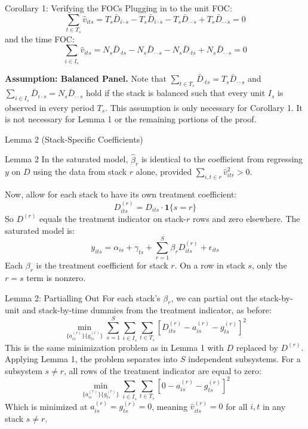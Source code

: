 \documentclass[11pt]{beamer}
\begin{document}
\begin{frame}{Corollary 1: Verifying the FOCs}
    Plugging in to the unit FOC:
    \[
        \sum_{t \in T_s} \hat{v}_{its}
        = T_s \bar{D}_{i \cdot s} - T_s \bar{D}_{i \cdot s}
          - T_s \bar{D}_{\cdot \cdot s} + T_s \bar{D}_{\cdot \cdot s} = 0
    \]
    and the time FOC:
    \[
        \sum_{i \in I_s} \hat{v}_{its}
        = N_s \bar{D}_{\cdot ts} - N_s \bar{D}_{\cdot \cdot s}
          - N_s \bar{D}_{\cdot ts} + N_s \bar{D}_{\cdot \cdot s} = 0
    \]

    \vspace{3mm}

    \textbf{Assumption: Balanced Panel.} Note that
    $\sum_{t \in T_s} \bar{D}_{\cdot ts} = T_s \bar{D}_{\cdot \cdot s}$ and
    $\sum_{i \in I_s} \bar{D}_{i \cdot s} = N_s \bar{D}_{\cdot \cdot s}$ hold if
    the stack is balanced such that every unit $I_s$ is observed in every period
    $T_s$. This assumption is only necessary for Corollary 1. It is not
    necessary for Lemma 1 or the remaining portions of the proof.
\end{frame}

\begin{frame}{Lemma 2 (Stack-Specific Coefficients)}
    \begin{block}{Lemma 2}
        In the saturated model, $\hat{\beta}_r$ is identical to the coefficient
        from regressing $y$ on $D$ using the data from stack $r$ alone, provided
        $\sum_{i,t \in r} \hat{v}_{itr}^2 > 0$.
    \end{block}

    Now, allow for each stack to have its own treatment coefficient:
    \[
        D^{(r)}_{its} = D_{its} \cdot \mathbf{1}\{s = r\}
    \]
    So $D^{(r)}$ equals the treatment indicator on stack-$r$ rows and zero
    elsewhere. The saturated model is:
    \[
        y_{its} = \alpha_{is} + \gamma_{ts}
        + \sum_{r=1}^{S} \beta_r D^{(r)}_{its} + \epsilon_{its}
    \]
    Each $\beta_r$ is the treatment coefficient for stack $r$. On a row in stack
    $s$, only the $r = s$ term is nonzero.
\end{frame}

\begin{frame}{Lemma 2: Partialling Out}
    For each stack's $\beta_r$, we can partial out the stack-by-unit and
    stack-by-time dummies from the treatment indicator, as before:
    \[
        \min_{\{a^{(r)}_{is}\}\{g^{(r)}_{ts}\}}
        \sum_{s=1}^{S} \sum_{i \in I_s} \sum_{t \in T_s}
        \left[ D^{(r)}_{its} - a^{(r)}_{is} - g^{(r)}_{ts} \right]^2
    \]
    This is the same minimization problem as in Lemma 1 with $D$ replaced by
    $D^{(r)}$. Applying Lemma 1, the problem separates into $S$ independent
    subsystems. For a subsystem $s \neq r$, all rows of the treatment indicator
    are equal to zero:
    \[
        \min_{\{a^{(r)}_{is}\}\{g^{(r)}_{ts}\}}
        \sum_{i \in I_s} \sum_{t \in T_s}
        \left[ 0 - a^{(r)}_{is} - g^{(r)}_{ts} \right]^2
    \]
    Which is minimized at $a^{(r)}_{is} = g^{(r)}_{ts} = 0$, meaning
    $\hat{v}^{(r)}_{its} = 0$ for all $i, t$ in any stack $s \neq r$.
\end{frame}
\end{document}
